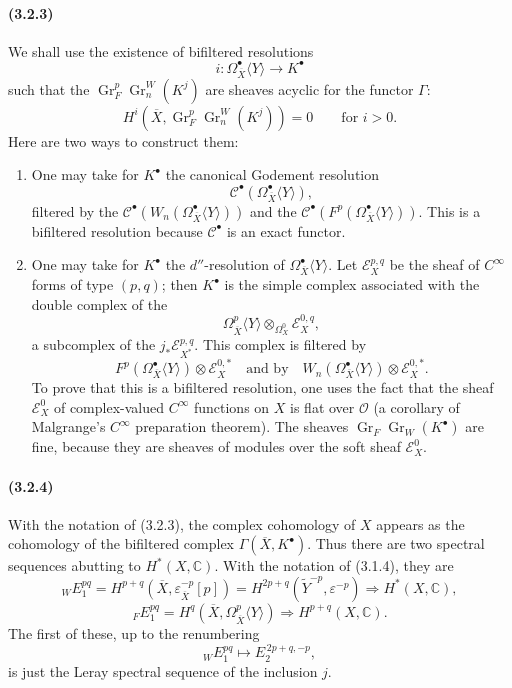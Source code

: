 \documentclass[10pt]{article}
\newcommand{\C}{\mathbb C}
\newcommand{\Gr}{\operatorname{Gr}}
\begin{document}
\paragraph{(3.2.3)} We shall use the existence of bifiltered resolutions
\[
i:\Omega_{\overline X}^{\bullet}\langle Y\rangle\longrightarrow K^\bullet
\]
such that the $\Gr_F^p\Gr_n^W(K^j)$ are sheaves acyclic for the functor $\Gamma$:
\[
H^i(\overline X,\Gr_F^p\Gr_n^W(K^j))=0\qquad \text{for }i>0.
\]
Here are two ways to construct them:
\begin{enumerate}[label=\alph*)]
\item One may take for $K^\bullet$ the canonical Godement resolution
\[
\mathcal C^\bullet(\Omega_{\overline X}^{\bullet}\langle Y\rangle),
\]
filtered by the $\mathcal C^\bullet(W_n(\Omega_{\overline X}^{\bullet}\langle Y\rangle))$ and the
$\mathcal C^\bullet(F^p(\Omega_{\overline X}^{\bullet}\langle Y\rangle))$. This is a bifiltered resolution because $\mathcal C^\bullet$ is an exact functor.
\item One may take for $K^\bullet$ the $d''$-resolution of $\Omega_{\overline X}^{\bullet}\langle Y\rangle$. Let $\mathcal E_X^{p,q}$ be the sheaf of $C^\infty$ forms of type $(p,q)$; then $K^\bullet$ is the simple complex associated with the double complex of the
\[
\Omega_{\overline X}^{p}\langle Y\rangle\otimes_{\Omega_X^0}\mathcal E_X^{0,q},
\]
a subcomplex of the $j_*\mathcal E_{X^*}^{p,q}$. This complex is filtered by
\[
F^p(\Omega_{\overline X}^{\bullet}\langle Y\rangle)\otimes\mathcal E_X^{0,*}
\quad\text{and by}\quad
W_n(\Omega_{\overline X}^{\bullet}\langle Y\rangle)\otimes\mathcal E_X^{0,*}.
\]
To prove that this is a bifiltered resolution, one uses the fact that the sheaf $\mathcal E_X^0$ of complex-valued $C^\infty$ functions on $X$ is flat over $\mathcal O$ (a corollary of Malgrange's $C^\infty$ preparation theorem). The sheaves $\Gr_F\Gr_W(K^\bullet)$ are fine, because they are sheaves of modules over the soft sheaf $\mathcal E_X^0$.
\end{enumerate}

\paragraph{(3.2.4)} With the notation of (3.2.3), the complex cohomology of $X$ appears as the cohomology of the bifiltered complex $\Gamma(\overline X,K^\bullet)$. Thus there are two spectral sequences abutting to $H^*(X,\C)$. With the notation of (3.1.4), they are
\[
\tag{3.2.4.1}
{}_W E_1^{pq}
 =H^{p+q}(\overline X,\varepsilon_{\overline X}^{-p}[p])
 =H^{2p+q}(\widetilde Y^{-p},\varepsilon^{-p})
 \Longrightarrow H^*(X,\C),
\]
\[
\tag{3.2.4.2}
{}_F E_1^{pq}
 =H^q(\overline X,\Omega_{\overline X}^p\langle Y\rangle)
 \Longrightarrow H^{p+q}(X,\C).
\]
The first of these, up to the renumbering
\[
{}_W E_1^{pq}\longmapsto E_2^{\,2p+q,-p},
\]
is just the Leray spectral sequence of the inclusion $j$.
\end{document}
